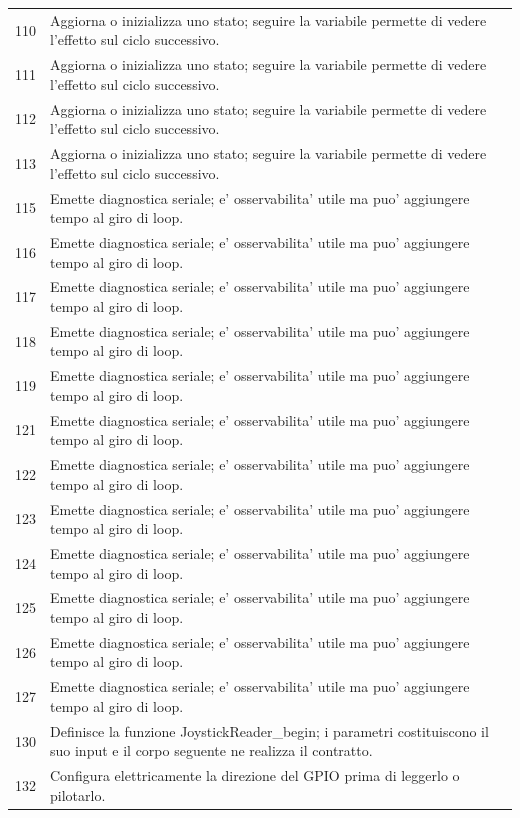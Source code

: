 \documentclass[11pt,a4paper]{article}
\begin{document}
\begin{longtable}{p{}p{}}
110 & Aggiorna o inizializza uno stato; seguire la variabile permette di vedere l'effetto sul ciclo successivo. \\
111 & Aggiorna o inizializza uno stato; seguire la variabile permette di vedere l'effetto sul ciclo successivo. \\
112 & Aggiorna o inizializza uno stato; seguire la variabile permette di vedere l'effetto sul ciclo successivo. \\
113 & Aggiorna o inizializza uno stato; seguire la variabile permette di vedere l'effetto sul ciclo successivo. \\
115 & Emette diagnostica seriale; e' osservabilita' utile ma puo' aggiungere tempo al giro di loop. \\
116 & Emette diagnostica seriale; e' osservabilita' utile ma puo' aggiungere tempo al giro di loop. \\
117 & Emette diagnostica seriale; e' osservabilita' utile ma puo' aggiungere tempo al giro di loop. \\
118 & Emette diagnostica seriale; e' osservabilita' utile ma puo' aggiungere tempo al giro di loop. \\
119 & Emette diagnostica seriale; e' osservabilita' utile ma puo' aggiungere tempo al giro di loop. \\
121 & Emette diagnostica seriale; e' osservabilita' utile ma puo' aggiungere tempo al giro di loop. \\
122 & Emette diagnostica seriale; e' osservabilita' utile ma puo' aggiungere tempo al giro di loop. \\
123 & Emette diagnostica seriale; e' osservabilita' utile ma puo' aggiungere tempo al giro di loop. \\
124 & Emette diagnostica seriale; e' osservabilita' utile ma puo' aggiungere tempo al giro di loop. \\
125 & Emette diagnostica seriale; e' osservabilita' utile ma puo' aggiungere tempo al giro di loop. \\
126 & Emette diagnostica seriale; e' osservabilita' utile ma puo' aggiungere tempo al giro di loop. \\
127 & Emette diagnostica seriale; e' osservabilita' utile ma puo' aggiungere tempo al giro di loop. \\
130 & Definisce la funzione JoystickReader\_\allowbreak{}begin; i parametri costituiscono il suo input e il corpo seguente ne realizza il contratto. \\
132 & Configura elettricamente la direzione del GPIO prima di leggerlo o pilotarlo. \\

\end{longtable}
\end{document}

